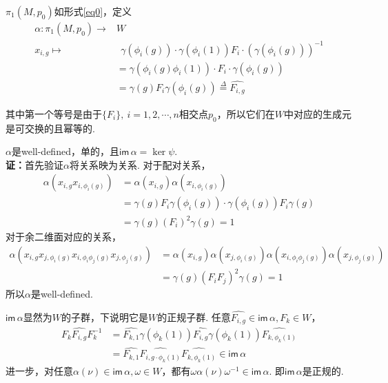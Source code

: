 \documentclass{article}
\theoremstyle{plain}%
\theoremstyle{definition}
\theoremstyle{remark}
\begin{document}
{{ $\pi_1(M,p_0)$如形式\ref{eq0}，定义
\begin{align*}
\alpha:\pi_1(M,p_0)\longrightarrow& W \\
 x_{i,g}\longmapsto& ~~\gamma(\phi_i(g))\cdot\gamma(\phi_i(1))F_i\cdot(\gamma(\phi_i(g)))^{-1}\\
 &=\gamma(\phi_i(g)\phi_i(1))\cdot F_i\cdot\gamma(\phi_i(g))\\
 &=\gamma(g)F_i\gamma(\phi_i(g))\overset{\Delta}{=}\widehat{F_{i,g}}
\end{align*}

其中第一个等号是由于$\{F_i\},~i=1,2,\cdots,n$相交点$p_0$，所以它们在$W$中对应的生成元是可交换的且幂等的.}
{\lem \label{lem23}$\alpha$是well-defined，单的，且$\mathsf{im}\, \alpha= \ker \psi.$}\\
{\bf 证：}首先验证$\alpha$将关系映为关系.
对于配对关系，
\begin{align*}
\alpha(x_{i,g}x_{i,\phi_i(g)})&=\alpha(x_{i,g})\alpha(x_{i,\phi_i(g)})\\
&=\gamma(g)F_i\gamma(\phi_i(g))\cdot \gamma(\phi_i(g))F_i\gamma(g)\\
&=\gamma(g)(F_i)^2\gamma(g)=1
\end{align*}
对于余二维面对应的关系，
\begin{align*}
\alpha(x_{i,g}x_{j,\phi_i(g)}x_{i,\phi_i\phi_j(g)}x_{j,\phi_j(g)})&=\alpha(x_{i,g})\alpha(x_{j,\phi_i(g)})\alpha(x_{i,\phi_i\phi_j(g)})\alpha(x_{j,\phi_j(g)})\\
&=\gamma(g)(F_iF_j)^2\gamma(g)=1
\end{align*}
所以$\alpha$是well-defined.

$\mathsf{im}\,\alpha$显然为$W$的子群，下说明它是$W$的正规子群.
任意$\widehat{F_{i,g}}\in \mathsf{im}\,\alpha,F_k\in W$，\begin{align*}
F_k\widehat{F_{i,g}}F_k^{-1}&=\widehat{F_{k,1}}\gamma(\phi_k(1))\widehat{F_{i,g}}\gamma(\phi_k(1))\widehat{F_{k,\phi_k(1)}}\\
&=\widehat{F_{k,1}}\widehat{F_{i,g\cdot\phi_k(1)}}\widehat{F_{k,\phi_k(1)}}\in \mathsf{im}\,\alpha
\end{align*}
进一步，对任意$\alpha(\nu)\in\mathsf{im}\,\alpha, \omega\in W$，都有$\omega\alpha(\nu)\omega^{-1}\in \mathsf{im}\,\alpha$.
即$\mathsf{im}\,\alpha$是正规的. 

}
\end{document}
